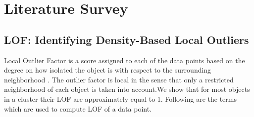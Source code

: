 \chapter{Literature Survey}\label{Unstructured}





	
	\section{LOF: Identifying Density-Based Local Outliers}
	Local Outlier Factor is a score assigned to each of the data points based on the degree on how
	isolated the object is with respect to the surrounding neighborhood \cite{b}.
	The outlier factor is local
	in the sense that only a restricted neighborhood of each object is taken into account.We show that
	for most objects in a cluster their LOF are approximately equal to 1. Following are the terms which are used to compute LOF of a data point.
	
